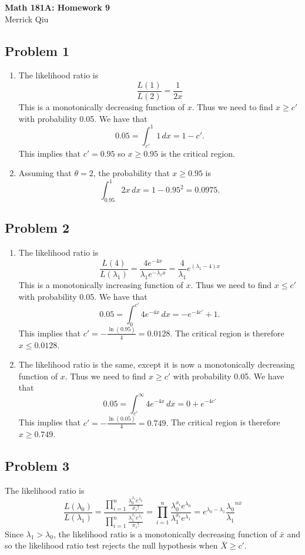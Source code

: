 \documentclass{article}
\begin{document}
\begin{center}
	\huge{\bf Math 181A: Homework 9} \\
	Merrick Qiu 
\end{center}

\subsection*{Problem 1}
\begin{enumerate}
	\item The likelihood ratio is 
	\[
		\frac{L(1)}{L(2)} = \frac{1}{2x}
	\]
	This is a monotonically decreasing function of $x$.
	Thus we need to find $x \geq c'$ with probability 0.05.
	We have that 
	\[
		0.05 = \int_{c'}^1 1 \,dx = 1-c'.
	\]
	This implies that $c' = 0.95$ so $x \geq 0.95$ is the critical region.
	\item Assuming that $\theta = 2$, the probability that $x \geq 0.95$ is
	\[
		\int_{0.95}^1 2x \,dx = 1 - 0.95^2 = 0.0975.
	\]
\end{enumerate}
\newpage 

\subsection*{Problem 2}
\begin{enumerate}
	\item The likelihood ratio is 
	\[
		\frac{L(4)}{L(\lambda_1)} 
		= \frac{4e^{-4x}}{\lambda_1e^{-\lambda_1x}}
		= \frac{4}{\lambda_1}e^{(\lambda_1-4)x}
	\]
	This is a monotonically increasing function of $x$.
	Thus we need to find $x \leq c'$ with probability 0.05.
	We have that 
	\[
		0.05 = \int_0^{c'} 4e^{-4x} \,dx = -e^{-4c'} + 1.
	\]
	This implies that $c' = -\frac{\ln(0.95)}{4} = 0.0128$.
	The critical region is therefore $x \leq 0.0128$.
	\item The likelihood ratio is the same, 
	except it is now a monotonically decreasing function of $x$.
	Thus we need to find $x \geq c'$ with probability 0.05.
	We have that 
	\[
		0.05 = \int_{c'}^{\infty} 4e^{-4x} \,dx = 0 + e^{-4c'}
	\]
	This implies that $c' = -\frac{\ln(0.05)}{4} = 0.749.$
	The critical region is therefore $x \geq 0.749$.
\end{enumerate}
\newpage 

\subsection*{Problem 3}
The likelihood ratio is 
\[
	\frac{L(\lambda_0)}{L(\lambda_1)} 
	= \frac{\prod_{i=1}^n \frac{\lambda_0^{x_i}e^{\lambda_0}}{x_i!}}{\prod_{i=1}^n \frac{\lambda_1^{x_i}e^{\lambda_1}}{x_i!}}
	= \prod_{i=1}^n \frac{\lambda_0^{x_i}e^{\lambda_0}}{\lambda_1^{x_i}e^{\lambda_1}}
	= e^{\lambda_0 - \lambda_1} \frac{\lambda_0}{\lambda_1}^{n\bar{x}}
\]
Since $\lambda_1 > \lambda_0$, the likelihood ratio is a monotonically decreasing function of $\bar{x}$
and so the likelihood ratio test rejects the null hypothesis when $\bar{X} \geq c'$.
\newpage 
\end{document}
